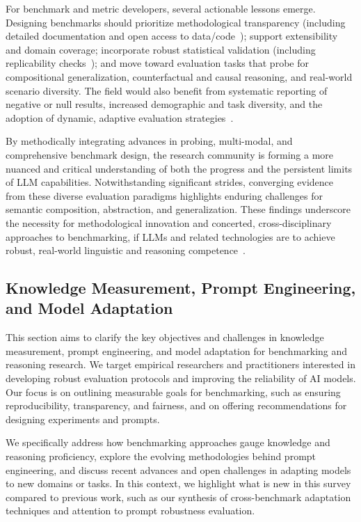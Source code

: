 \documentclass[sigconf]{acmart}
\begin{document}
For benchmark and metric developers, several actionable lessons emerge. Designing benchmarks should prioritize methodological transparency (including detailed documentation and open access to data/code~\cite{ref94, ref95, ref55}); support extensibility and domain coverage; incorporate robust statistical validation (including replicability checks~\cite{ref22, ref61}); and move toward evaluation tasks that probe for compositional generalization, counterfactual and causal reasoning, and real-world scenario diversity. The field would also benefit from systematic reporting of negative or null results, increased demographic and task diversity, and the adoption of dynamic, adaptive evaluation strategies~\cite{ref55, ref61, ref63, ref64, ref94}.

By methodically integrating advances in probing, multi-modal, and comprehensive benchmark design, the research community is forming a more nuanced and critical understanding of both the progress and the persistent limits of LLM capabilities. Notwithstanding significant strides, converging evidence from these diverse evaluation paradigms highlights enduring challenges for semantic composition, abstraction, and generalization. These findings underscore the necessity for methodological innovation and concerted, cross-disciplinary approaches to benchmarking, if LLMs and related technologies are to achieve robust, real-world linguistic and reasoning competence~\cite{ref92, ref94, ref96, ref97, ref98, ref99}.

\subsection{Knowledge Measurement, Prompt Engineering, and Model Adaptation}

This section aims to clarify the key objectives and challenges in knowledge measurement, prompt engineering, and model adaptation for benchmarking and reasoning research. We target empirical researchers and practitioners interested in developing robust evaluation protocols and improving the reliability of AI models. Our focus is on outlining measurable goals for benchmarking, such as ensuring reproducibility, transparency, and fairness, and on offering recommendations for designing experiments and prompts.

We specifically address how benchmarking approaches gauge knowledge and reasoning proficiency, explore the evolving methodologies behind prompt engineering, and discuss recent advances and open challenges in adapting models to new domains or tasks. In this context, we highlight what is new in this survey compared to previous work, such as our synthesis of cross-benchmark adaptation techniques and attention to prompt robustness evaluation.
\end{document}
